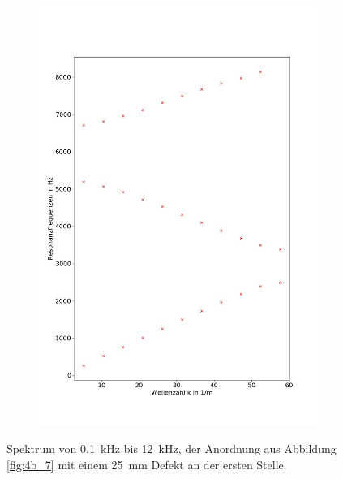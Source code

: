 \begin{figure}
\begin{subfigure}{0.34\textwidth}
\includegraphics[width=\textwidth]{content/Scripts/4b_7_2a.jpg}
\end{subfigure}
\caption{Spektrum von 0.1~kHz bis 12~kHz, der Anordnung aus Abbildung \ref{fig:4b_7} mit einem 25~mm Defekt an der ersten Stelle.}
\label{fig:4b_7_2a}
\end{figure}
